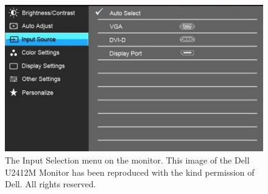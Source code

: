 \begin{figure}
\centerline{\includegraphics[width=12cm]{images/DellInputMenu.jpg}}
\caption{The Input Selection menu on the monitor. This image  of the Dell U2412M Monitor has been reproduced with the kind permission of Dell. All rights reserved.}\label{figure:monitorswitch}
\end{figure}






